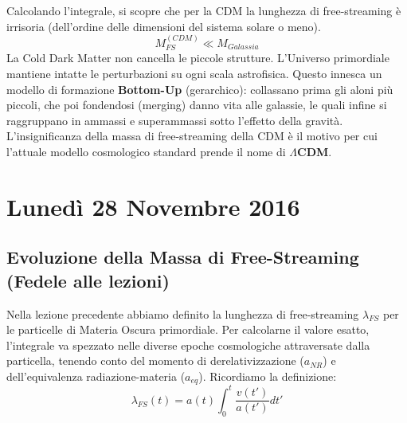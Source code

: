 \documentclass[11pt,a4paper]{report}
\begin{document}
Calcolando l'integrale, si scopre che per la CDM la lunghezza di free-streaming è irrisoria (dell'ordine delle dimensioni del sistema solare o meno).
\begin{equation}
M_{FS}^{(CDM)} \ll M_{Galassia}
\end{equation}
La Cold Dark Matter non cancella le piccole strutture. L'Universo primordiale mantiene intatte le perturbazioni su ogni scala astrofisica. Questo innesca un modello di formazione \textbf{Bottom-Up} (gerarchico): collassano prima gli aloni più piccoli, che poi fondendosi (merging) danno vita alle galassie, le quali infine si raggruppano in ammassi e superammassi sotto l'effetto della gravità.
L'insignificanza della massa di free-streaming della CDM è il motivo per cui l'attuale modello cosmologico standard prende il nome di \textbf{$\Lambda$CDM}.

\chapter{Lunedì 28 Novembre 2016}

\section{Evoluzione della Massa di Free-Streaming (Fedele alle lezioni)}

Nella lezione precedente abbiamo definito la lunghezza di free-streaming $\lambda_{FS}$ per le particelle di Materia Oscura primordiale. Per calcolarne il valore esatto, l'integrale va spezzato nelle diverse epoche cosmologiche attraversate dalla particella, tenendo conto del momento di derelativizzazione ($a_{NR}$) e dell'equivalenza radiazione-materia ($a_{eq}$).
Ricordiamo la definizione:
\begin{equation}
\lambda_{FS}(t) = a(t) \int_0^t \frac{v(t')}{a(t')} dt'
\end{equation}
\end{document}
